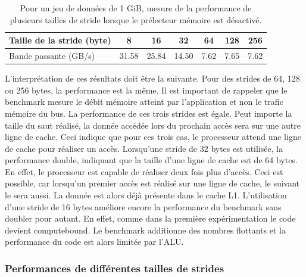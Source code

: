         \begin{table}[h!]
        \centering
        \begin{tabular}{|l|c|c|c|c|c|c|}
        \hline
        Taille de la stride (byte) & 8 & 16 & 32 & 64 & 128 & 256 \\ \hline
        Bande passante (GB/s) & 31.58 & 25.84 & 14.50 & 7.62 & 7.65 & 7.62 \\ \hline
        \end{tabular}%
        \caption{Pour un jeu de données de 1 GiB, mesure de la performance de plusieurs tailles de stride lorsque le prélecteur mémoire est désactivé.}
        \label{tab:dml_cache_line}
        \end{table}
        
         L'interprétation de ces résultats doit être la suivante. Pour des \glspl{stride} de 64, 128 ou 256 bytes, la performance est la même. Il est important de rappeler que le benchmark mesure le débit mémoire atteint par l'application et non le trafic mémoire du bus. La performance de ces trois strides est égale.  Peut importe la taille du saut réalisé, la donnée accédée lors du prochain accès sera sur une autre ligne de cache. Ceci indique que pour ces trois cas, le processeur attend une ligne de cache pour réaliser un accès.  Lorsqu'une stride de 32 bytes est utilisée, la performance double, indiquant que la taille d'une ligne de cache est de 64 bytes. En effet, le processeur est capable de réaliser deux fois plus d'accès. Ceci est possible, car lorsqu'un premier accès est réalisé sur une ligne de cache, le suivant le sera aussi. La donnée est alors déjà présente dans le cache L1. L'utilisation d'une stride de 16 bytes améliore encore la performance du benchmark sans doubler pour autant. En effet, comme dans la première expérimentation le code devient \gls{computebound}. Le benchmark additionne des nombres flottants et la performance du code est alors limitée par l'ALU. 
    
    
    \subsubsection{Performances de différentes tailles de strides} \label{sec:dml_bad_stride}
        
